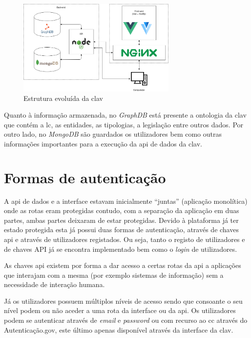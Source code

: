 \begin{figure}[H]
    \centering
    \includegraphics[width=0.7\textwidth]{img/clav_struct2.png}
    \caption{Estrutura evoluída da \acrshort{clav}}\label{fig:clav_struct2}
\end{figure}

Quanto à informação armazenada, no \textit{GraphDB} está presente a ontologia da \acrshort{clav} que contém a \acrshort{lc}, as entidades, as tipologias, a legislação entre outros dados. Por outro lado, no \textit{MongoDB} são guardados os utilizadores bem como outras informações importantes para a execução da \acrshort{api} de dados da \acrshort{clav}.

\section{Formas de autenticação}\label{sec:autenticacao}
A \acrshort{api} de dados e a interface estavam inicialmente ``juntas'' (aplicação monolítica) onde as rotas eram protegidas contudo, com a separação da aplicação em duas partes, ambas partes deixaram de estar protegidas. Devido à plataforma já ter estado protegida esta já possui duas formas de autenticação, através de chaves \acrshort{api} e através de utilizadores registados. Ou seja, tanto o registo de utilizadores e de chaves API já se encontra implementado bem como o \textit{login} de utilizadores.

As chaves \acrshort{api} existem por forma a dar acesso a certas rotas da \acrshort{api} a aplicações que interajam com a mesma (por exemplo sistemas de informação) sem a necessidade de interação humana.

Já os utilizadores possuem múltiplos níveis de acesso sendo que consoante o seu nível podem ou não aceder a uma rota da interface ou da \acrshort{api}. Os utilizadores podem se autenticar através de \textit{email} e \textit{password} ou com recurso ao \acrfull{cc} através do Autenticação.gov, este último apenas disponível através da interface da \acrshort{clav}.

